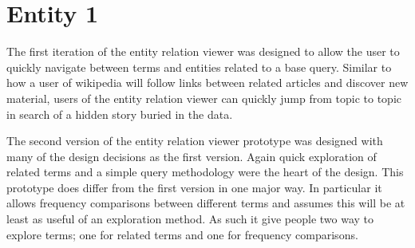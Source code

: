 \section{Entity 1}
The first iteration of the entity relation viewer was designed to allow the user to quickly navigate between terms and entities related to a base query. Similar to how a user of wikipedia will follow links between related articles and discover new material, users of the entity relation viewer can quickly jump from topic to topic in search of a hidden story buried in the data.

The second version of the entity relation viewer prototype was designed with many of the design decisions as the first version. Again quick exploration of related terms and a simple query  methodology were the heart of the design. This prototype does differ from the first version in one major way. In particular it allows frequency comparisons between different terms and assumes this will be at least as useful of an exploration method. As such it give people two way to explore terms; one for related terms and one for frequency comparisons.


